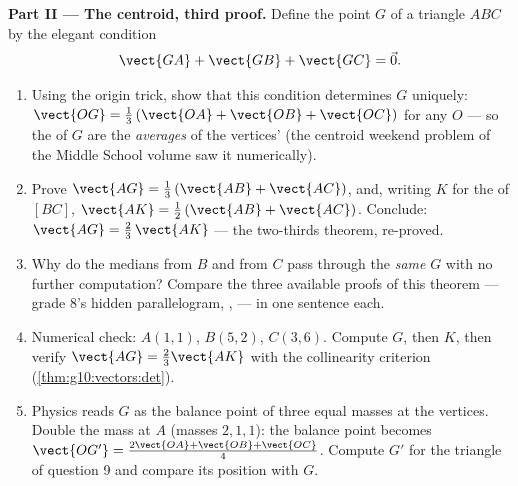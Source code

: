 \begin{problem}
\medskip
\noindent\textbf{Part II --- The centroid, third proof.}
Define the point $G$ of a triangle $ABC$ by the elegant
condition
\[
\vect{GA} + \vect{GB} + \vect{GC} = \vec 0 .
\]
\begin{enumerate}[resume]
  \item Using the origin trick, show that this condition
        determines $G$ uniquely:
        $\vect{OG} = \frac13\left(\vect{OA} + \vect{OB} +
        \vect{OC}\right)$ for any $O$ --- so the  of
        $G$ are the \emph{averages} of the vertices'
        (the centroid weekend problem of the Middle School volume saw it numerically).
  \item Prove $\vect{AG} = \frac13\left(\vect{AB} +
        \vect{AC}\right)$, and, writing $K$ for the  of
        $[BC]$, $\vect{AK} = \frac12\left(\vect{AB} +
        \vect{AC}\right)$. Conclude:
        $\vect{AG} = \frac23\,\vect{AK}$ --- the two-thirds
        theorem, re-proved.
  \item Why do the medians from $B$ and from $C$ pass through
        the \emph{same} $G$ with no further computation?
        Compare the three available proofs of this theorem ---
        grade 8's hidden parallelogram, ,  ---
        in one sentence each.
  \item Numerical check: $A(1, 1)$, $B(5, 2)$, $C(3, 6)$.
        Compute $G$, then $K$, then verify
        $\vect{AG} = \frac23 \vect{AK}$ with the collinearity
        criterion (\cref{thm:g10:vectors:det}).
  \item Physics reads $G$ as the balance point of three equal
        masses at the vertices. Double the mass at $A$ (masses
        $2, 1, 1$): the balance point becomes
        $\vect{OG'} = \frac{2\vect{OA} + \vect{OB} +
        \vect{OC}}{4}$. Compute $G'$ for the triangle of
        question 9 and compare its position with $G$.
\end{enumerate}


\end{problem}
